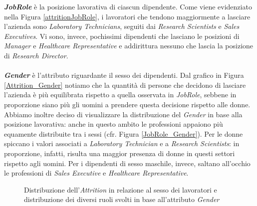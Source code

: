 \noindent\textbf{\textit{JobRole}} è la posizione lavorativa di ciascun dipendente. Come viene evidenziato nella Figura \ref{attritionJobRole}, i lavoratori che tendono maggiormente a lasciare l'azienda sono \textit{Laboratory Technicians}, seguiti dai \textit{Research Scientists} e \textit{Sales Executives}. 
Vi sono, invece, pochissimi dipendenti che lasciano le posizioni di \textit{Manager} e \textit{Healthcare Representative} e addirittura nessuno che lascia la posizione di \textit{Research Director}.
\\\\\textbf{\textit{Gender}} è l'attributo riguardante il sesso dei dipendenti. Dal grafico in Figura \ref{Attrition_Gender} notiamo che la quantità di persone che decidono di lasciare l'azienda è più equilibrata rispetto a quella osservata in \textit{JobRole}, sebbene in proporzione siano più gli uomini a prendere questa decisione rispetto alle donne. Abbiamo inoltre deciso di visualizzare la distribuzione del \textit{Gender} in base alla posizione lavorativa: anche in questo ambito le professioni appaiono più equamente distribuite tra i sessi (cfr. Figura \ref{JobRole_Gender}). Per le donne spiccano i valori associati a \textit{Laboratory Technician} e a \textit{Research Scientists}: in proporzione, infatti, risulta una maggior presenza di donne in questi settori rispetto agli uomini. Per i dipendenti di sesso maschile, invece, saltano all'occhio le professioni di \textit{Sales Executive} e \textit{Healthcare Representative}. \begin{figure}[H]
	\centering
	\quad
	\caption{Distribuzione dell'\textit{Attrition} in relazione al sesso dei lavoratori e distribuzione dei diversi ruoli svolti in base all'attributo \textit{Gender}}
	\label{GraficiAttrigionGenderJobRoleGender}
\end{figure}
